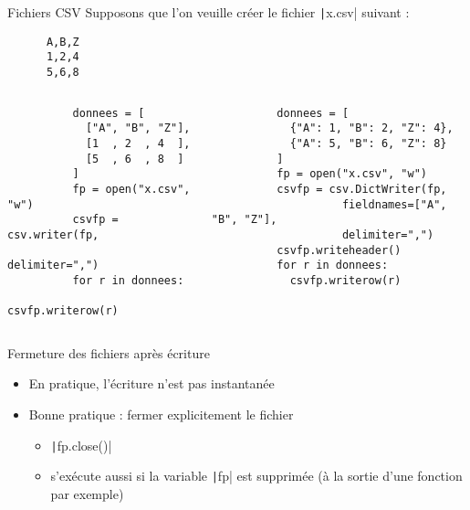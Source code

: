 \documentclass[10pt]{beamer}
\begin{document}
\begin{frame}[fragile]{Fichiers CSV}
  Supposons que l'on veuille créer le fichier \texttt|x.csv| suivant :

  \begin{beamercodeblock}
    \begin{verbatim}
      A,B,Z
      1,2,4
      5,6,8
    \end{verbatim}
  \end{beamercodeblock}

  \begin{columns}
    \begin{column}{0.45\textwidth}


      \begin{beamercodeblock}
        \begin{verbatim}
          donnees = [
            ["A", "B", "Z"],
            [1  , 2  , 4  ],
            [5  , 6  , 8  ]
          ]
          fp = open("x.csv", "w")
          csvfp = csv.writer(fp, 
                    delimiter=",")
          for r in donnees:
            csvfp.writerow(r)
        \end{verbatim}
      \end{beamercodeblock}
    \end{column} \hfill
    \begin{column}{0.52\textwidth}


      \begin{beamercodeblock}
        \begin{verbatim}
          donnees = [
            {"A": 1, "B": 2, "Z": 4},
            {"A": 5, "B": 6, "Z": 8}
          ]
          fp = open("x.csv", "w")
          csvfp = csv.DictWriter(fp,
                    fieldnames=["A", "B", "Z"],
                    delimiter=",")
          csvfp.writeheader()
          for r in donnees:
            csvfp.writerow(r)
        \end{verbatim}
      \end{beamercodeblock}
    \end{column}
  \end{columns}
\end{frame}

\begin{frame}[fragile]{Fermeture des fichiers après écriture}
  \begin{itemize}
    \item En pratique, l'écriture n'est pas instantanée
    \item Bonne pratique : fermer explicitement le fichier
    \begin{itemize}
      \item \texttt|fp.close()|
      \item s'exécute aussi si la variable \texttt|fp| est supprimée (à la sortie d'une fonction par exemple)
    \end{itemize}
  \end{itemize}
\end{frame}
\end{document}
